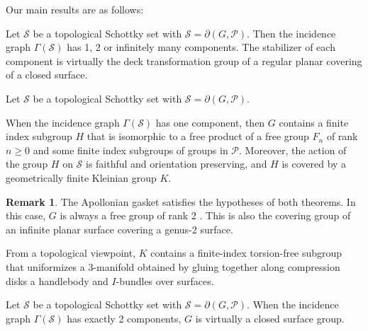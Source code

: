 \documentclass[11pt]{article}
\newenvironment{customthm}[1]
  {\renewcommand\theinnercustomthm{#1}\innercustomthm}
  {\endinnercustomthm}
\theoremstyle{definition}
\newtheorem{remark}[theorem]{Remark}
\begin{document}
Our main results are as follows: 

\begin{customthm}{A} 
\label{thm:incidence} 
Let $\mathcal{S}$ be a topological Schottky set with $\mathcal{S} = \partial(G, \mathcal{P})$.   Then the incidence graph $\Gamma(\mathcal{S})$ has 1, 2 or infinitely many components. 
The stabilizer of each component is virtually the deck transformation group of a regular planar covering of a closed surface. 
\end{customthm} 


 
\begin{customthm}{B}
    
 \label{thm:one} Let $\mathcal{S}$ be a topological Schottky set with $\mathcal{S} = \partial(G, \mathcal{P})$.
 
When the incidence graph $\Gamma(\mathcal{S})$ has one component, then $G$ contains a finite index subgroup $H$ that is isomorphic to
a free product of a free group $F_n$ of rank $n\geq 0$ and some finite index subgroups of groups in $\mathcal{P}$. Moreover, the action of the group $H$ on $\mathcal{S}$ is faithful and orientation preserving, and $H$ is covered by a geometrically finite Kleinian group $K$.
\end{customthm} 
\begin{remark} The Apollonian gasket satisfies the hypotheses of both theorems.  In this case, $G$ is always a free group of rank 2 \cite{HPW}.  This is also the covering group of an infinite planar surface covering a genus-2 surface. \end{remark}

From a topological viewpoint, $K$ contains a finite-index torsion-free subgroup that uniformizes a 3-manifold 
obtained by gluing together along compression disks a handlebody and $I$-bundles over surfaces.



 \begin{customthm}{C} \label{thm:two} Let $\mathcal{S}$ be a topological Schottky set with $\mathcal{S} = \partial(G, \mathcal{P})$.
When the incidence graph $\Gamma(\mathcal{S})$  has exactly  2 components, $G$ is virtually a closed surface group. \end{customthm}
\end{document}
